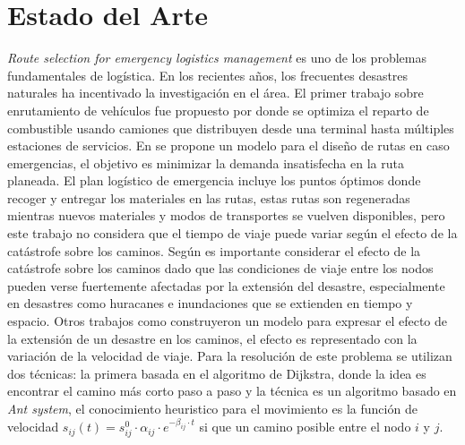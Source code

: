 \section{Estado del Arte}


\textit{Route selection for emergency logistics management} es uno de los problemas fundamentales de logística. En los recientes años, los frecuentes desastres naturales ha incentivado la investigación en el área. El primer trabajo sobre enrutamiento de vehículos fue propuesto por \cite{dantzig1959truck} donde se optimiza el reparto de combustible usando camiones que distribuyen desde una terminal hasta múltiples estaciones de servicios. En \cite{ozdamar2004emergency} se propone un modelo para el diseño de rutas en caso emergencias, el objetivo es minimizar la demanda insatisfecha en la ruta planeada. El plan logístico de emergencia incluye los puntos óptimos donde recoger y entregar los materiales en las rutas, estas rutas son regeneradas mientras nuevos materiales y modos de transportes se vuelven disponibles, pero este trabajo no considera que el tiempo de viaje puede variar según el efecto de la catástrofe sobre los caminos.
Según \cite{farahmand1997application,tufekci1995integrated} es importante considerar el efecto de la catástrofe sobre los caminos dado que las condiciones de viaje entre los nodos pueden verse fuertemente afectadas por la extensión del desastre, especialmente en desastres como huracanes e inundaciones que se extienden en tiempo y espacio.
Otros trabajos como \cite{Yuan20091081} construyeron un modelo para expresar el efecto de la extensión de un desastre en los caminos, el efecto es representado con la variación de la velocidad de viaje. Para la resolución de este problema se utilizan dos técnicas: la primera basada en el algoritmo de Dijkstra, donde la idea es encontrar el camino más corto paso a paso y la técnica es un algoritmo basado en \textit{Ant system}, el conocimiento heuristico para el movimiento es la función de velocidad $s_{ij}(t) = s_{ij}^0 \cdot \alpha_{ij} \cdot e^{-\beta_{ij}\cdot t}$ si que un camino posible entre el nodo $i$ y $j$.

